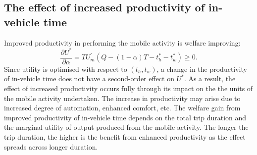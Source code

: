 \documentclass[12pt,a4paper,british]{article}
\begin{document}
\subsection*{The effect of increased productivity of in-vehicle time}

Improved productivity in performing the mobile activity is welfare improving:%
\begin{equation*}
    \frac{\partial U^{\ast}}{\partial \alpha} = T U^{\prime}_m\left( Q-\left(1-\alpha\right)T-t_{h}^{\ast}-t_{w}^{\ast} \right) \geq 0.
\end{equation*}
Since utility is optimised with respect to $\left(t_{h},t_{w}\right)$, a change in the productivity of in-vehicle time does not have a second-order effect on $U^{\ast}$. As a result, the effect of increased productivity occurs fully through its impact on the the units of the mobile activity undertaken. The increase in productivity may arise due to increased degree of automation, enhanced comfort, etc. The welfare gain from improved productivity of in-vehicle time depends on the total trip duration and the marginal utility of output produced from the mobile activity. The longer the trip duration, the higher is the benefit from enhanced productivity as the effect spreads across longer duration.
\end{document}
